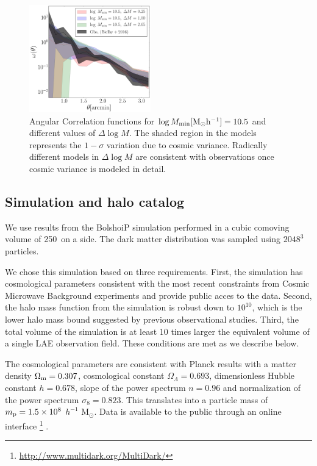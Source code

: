 \documentclass{emulateapj}
\newcommand{\hMpc}{{\ifmmode{h^{-1}{\rm Mpc}}\else{$h^{-1}$Mpc}\fi}}
\newcommand{\hMsun}{{\ifmmode{h^{-1}{\rm {M_{\odot}}}}\else{$h^{-1}{\rm{M_{\odot}}}$}\fi}}
\begin{document}
\begin{figure}
  \includegraphics[width=0.47\textwidth]{fig5.pdf}
\caption{ Angular Correlation functions for $\log M_{\rm
    min}[\rm{M_{\odot}h^{-1}}]=10.5$ and different values of $\Delta \log
  M$.  
  The shaded region in the models represents the $1-\sigma$ variation
  due to cosmic variance. Radically different models in $\Delta \log M$ are consistent with
  observations once cosmic variance is modeled in detail.} 
\label{fig:corr}
\end{figure}


\subsection{Simulation and halo catalog}
\label{subsec:sim}

We use results from the BolshoiP simulation \citep{Bolshoi,BolshoiP} 
performed in a cubic  comoving volume of 250\hMpc\  on a side. 
The dark matter distribution was sampled using  $2048^{3}$
particles. 

We chose this simulation based on three requirements. 
First, the simulation has cosmological parameters consistent
with the most recent constraints from Cosmic Microwave Background
experiments and provide public acces to the data.
Second, the halo mass function from the simulation is robust
down to  $10^{10}$\hMsun, which is the lower halo mass bound suggested
by previous observational 
studies\citep{Hayashino2004,Gawiser2007,Ouchi2010,Bielby16}. 
Third, the total volume of the simulation is at least 10 times
larger the equivalent volume of a single LAE observation field.
These conditions are met as we describe below. 

The cosmological parameters are consistent with Planck
results \citep{Planck2014} with a matter density 
$\Omega_{\rm m} = 0.307$, cosmological constant
$\Omega_{\Lambda}=0.693$, dimensionless Hubble constant $h=0.678$, slope
of the power spectrum  $n=0.96$ and normalization of the power
spectrum $\sigma_{8}=0.823$.  
This translates into a particle mass of  $m_{\rm p}=1.5\times 10^{8}$
$h^{-1}$ M$_{\odot}$. 
Data is available to the
public through an online
interface \footnote{\url{http://www.multidark.org/MultiDark/}}
\citep{MultiDark}.    
\end{document}
